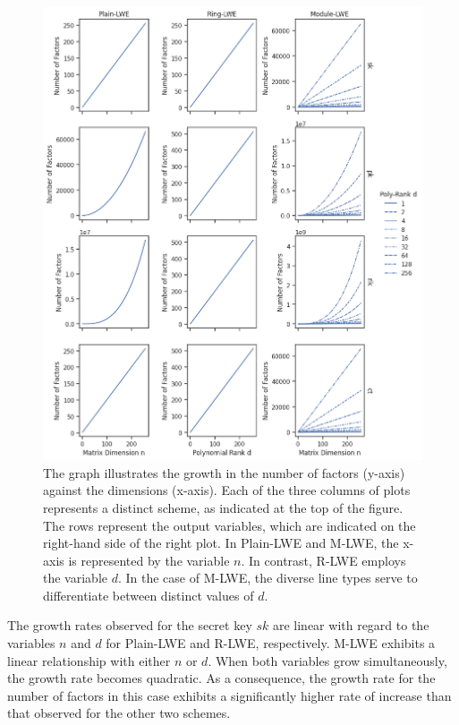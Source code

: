 \begin{figure}[htp]
  \centering
  \includegraphics[scale=0.52]{images/OutputFactors.png}
  \caption[Output Variable Factors by Scheme]{The graph illustrates the growth in the number of factors (y-axis) against the dimensions (x-axis). Each of the three columns of plots represents a distinct scheme, as indicated at the top of the figure. The rows represent the output variables, which are indicated on the right-hand side of the right plot. In Plain-LWE and M-LWE, the x-axis is represented by the variable $n$. In contrast, R-LWE employs the variable $d$. In the case of M-LWE, the diverse line types serve to differentiate between distinct values of $d$.}
  \label{fig:OutputFactors}
\end{figure}

The growth rates observed for the secret key $sk$ are linear with regard to the variables $n$ and $d$ for Plain-LWE and R-LWE, respectively. M-LWE exhibits a linear relationship with either $n$ or $d$. When both variables grow simultaneously, the growth rate becomes quadratic. As a consequence, the growth rate for the number of factors in this case exhibits a significantly higher rate of increase than that observed for the other two schemes.

